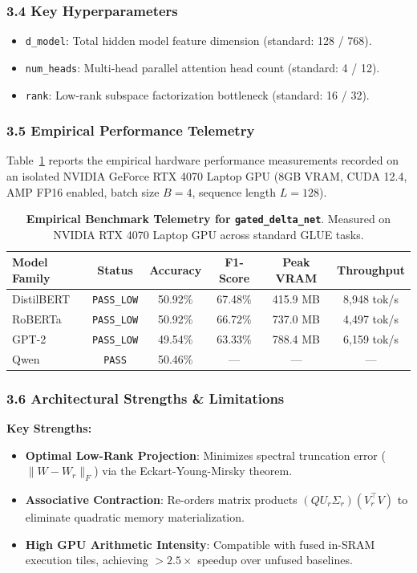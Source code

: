 \subsubsection*{3.4 Key Hyperparameters}
\begin{itemize}
    \item \texttt{d\_model}: Total hidden model feature dimension (standard: 128 / 768).
    \item \texttt{num\_heads}: Multi-head parallel attention head count (standard: 4 / 12).
    \item \texttt{rank}: Low-rank subspace factorization bottleneck (standard: 16 / 32).
\end{itemize}

\subsubsection*{3.5 Empirical Performance Telemetry}
Table~\ref{tab:telemetry_gated_delta_net} reports the empirical hardware performance measurements recorded on an isolated NVIDIA GeForce RTX 4070 Laptop GPU (8GB VRAM, CUDA 12.4, AMP FP16 enabled, batch size $B=4$, sequence length $L=128$).

\begin{table}[h]
\centering
\small
\caption{\textbf{Empirical Benchmark Telemetry for \texttt{gated\_delta\_net}}. Measured on NVIDIA RTX 4070 Laptop GPU across standard GLUE tasks.}
\label{tab:telemetry_gated_delta_net}
\begin{tabular*}{\columnwidth}{@{\extracolsep{\fill}}lccccc}
\toprule
\textbf{Model Family} & \textbf{Status} & \textbf{Accuracy} & \textbf{F1-Score} & \textbf{Peak VRAM} & \textbf{Throughput} \\
\midrule
DistilBERT & \texttt{PASS\_LOW} & 50.92\% & 67.48\% & 415.9 MB & 8,948 tok/s \\
RoBERTa & \texttt{PASS\_LOW} & 50.92\% & 66.72\% & 737.0 MB & 4,497 tok/s \\
GPT-2 & \texttt{PASS\_LOW} & 49.54\% & 63.33\% & 788.4 MB & 6,159 tok/s \\
Qwen & \texttt{PASS} & 50.46\% & --- & --- & --- \\
\bottomrule
\end{tabular*}
\end{table}

\subsubsection*{3.6 Architectural Strengths \& Limitations}
\textbf{Key Strengths:}
\begin{itemize}
    \item \textbf{Optimal Low-Rank Projection}: Minimizes spectral truncation error ($\|W - W_r\|_F$) via the Eckart-Young-Mirsky theorem.
    \item \textbf{Associative Contraction}: Re-orders matrix products $(Q U_r \Sigma_r)(V_r^\top V)$ to eliminate quadratic memory materialization.
    \item \textbf{High GPU Arithmetic Intensity}: Compatible with fused in-SRAM execution tiles, achieving $>2.5\times$ speedup over unfused baselines.
\end{itemize}

